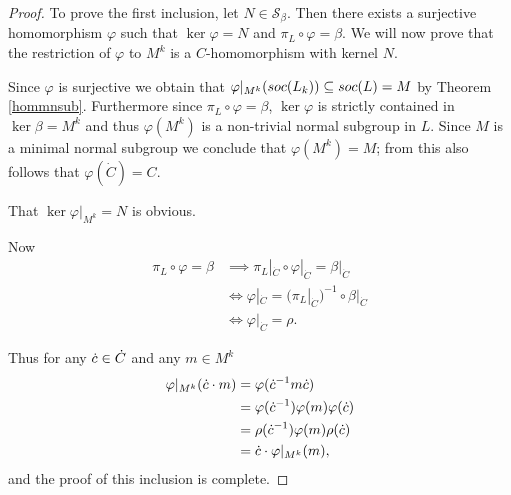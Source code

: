 \begin{proof}
    To prove the first inclusion, let $N \in \mathscr{S}_\beta$. Then there exists a surjective homomorphism $\varphi$ such that $\ker \varphi = N$ and $\pi_L \circ \varphi = \beta$. We will now prove that the restriction of $\varphi$ to $M^k$ is a $C$-homomorphism with kernel $N$.


    Since $\varphi$ is surjective we obtain that $\varphi|_{M^k}(soc {(L_k)}) \subseteq soc {(L)} = M$ by Theorem \ref{hommnsub}. Furthermore since $\pi_L \circ \varphi = \beta$, $\ker \varphi$ is strictly contained in $\ker \beta = M^k$ and thus $\varphi(M^k)$ is a non-trivial normal subgroup in $L$. Since $M$ is a minimal normal subgroup we conclude that $\varphi(M^k) = M$; from this also follows that $\varphi(\dot{C}) = C$.

    That $\ker \varphi|_{M^k} = N$ is obvious.

    Now
    \begin{align*}
        \pi_L \circ \varphi = \beta &\implies \pi_L|_{\dot C} \circ \varphi|_{\dot C} = \beta|_{\dot C} \\
                                    &\iff \varphi|_{\dot C} = (\pi_L|_{\dot C})^{-1} \circ \beta|_{\dot C} \\
                                    &\iff \varphi|_{\dot C} = \rho. 
    \end{align*} 

    Thus for any $\dot{c} \in \dot{C}$ and any $m \in M^k$
    \begin{align*}
        \varphi|_{M^k}(\dot{c} \cdot m) &= \varphi(\dot{c}^{-1} m \dot{c}) \\
                                    &= \varphi(\dot{c}^{-1}) \varphi(m) \varphi(\dot{c}) \\
                                    &= \rho(\dot{c}^{-1})\varphi(m) \rho(\dot{c}) \\
                                    &= \dot{c} \cdot \varphi|_{M^k}(m),
    \end{align*}
    and the proof of this inclusion is complete.


\end{proof}
